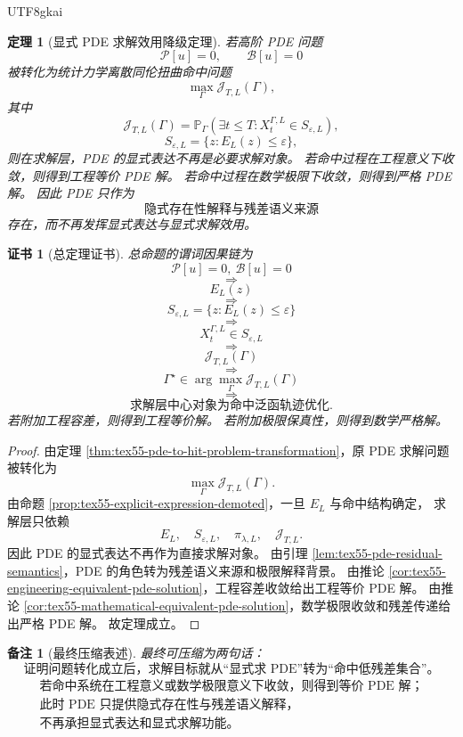 \documentclass[12pt]{article}
\newtheorem{theorem}{定理}[section]
\newtheorem{remark}{备注}[section]
\newtheorem{Certificate}{证书}[section]
\begin{document}
\begin{CJK*}{UTF8}{gkai}
\begin{theorem}[显式 PDE 求解效用降级定理]
\label{thm:tex55-explicit-pde-solution-demotion}
若高阶 PDE 问题
\[
  \mathcal P[u]=0,
  \qquad
  \mathcal B[u]=0
\]
被转化为统计力学离散同伦扭曲命中问题
\[
  \max_\Gamma\mathcal J_{T,L}(\Gamma),
\]
其中
\[
  \mathcal J_{T,L}(\Gamma)
  =
  \mathbb P_\Gamma
  \left(
  \exists t\le T:
  X_t^{\Gamma,L}\in S_{\varepsilon,L}
  \right),
\]
\[
  S_{\varepsilon,L}
  =
  \{z:E_L(z)\le\varepsilon\},
\]
则在求解层，PDE 的显式表达不再是必要求解对象。
若命中过程在工程意义下收敛，则得到工程等价 PDE 解。
若命中过程在数学极限下收敛，则得到严格 PDE 解。
因此 PDE 只作为
\[
  \boxed{
  \text{隐式存在性解释与残差语义来源}
  }
\]
存在，而不再发挥显式表达与显式求解效用。
\end{theorem}

\begin{Certificate}[总定理证书]
\label{cert:tex55-explicit-pde-solution-demotion}
总命题的谓词因果链为
\[
  \mathcal P[u]=0,\ \mathcal B[u]=0
\]
\[
  \Longrightarrow
\]
\[
  E_L(z)
\]
\[
  \Longrightarrow
\]
\[
  S_{\varepsilon,L}=\{z:E_L(z)\le\varepsilon\}
\]
\[
  \Longrightarrow
\]
\[
  X_t^{\Gamma,L}\in S_{\varepsilon,L}
\]
\[
  \Longrightarrow
\]
\[
  \mathcal J_{T,L}(\Gamma)
\]
\[
  \Longrightarrow
\]
\[
  \Gamma^\star\in\arg\max_\Gamma\mathcal J_{T,L}(\Gamma)
\]
\[
  \Longrightarrow
\]
\[
  \text{求解层中心对象为命中泛函轨迹优化}.
\]
若附加工程容差，则得到工程等价解。
若附加极限保真性，则得到数学严格解。
\end{Certificate}

\begin{proof}
由定理 \ref{thm:tex55-pde-to-hit-problem-transformation}，原 PDE 求解问题被转化为
\[
  \max_\Gamma\mathcal J_{T,L}(\Gamma).
\]
由命题 \ref{prop:tex55-explicit-expression-demoted}，一旦 \(E_L\) 与命中结构确定，
求解层只依赖
\[
  E_L,\quad S_{\varepsilon,L},\quad \pi_{\lambda,L},\quad \mathcal J_{T,L}.
\]
因此 PDE 的显式表达不再作为直接求解对象。
由引理 \ref{lem:tex55-pde-residual-semantics}，PDE 的角色转为残差语义来源和极限解释背景。
由推论 \ref{cor:tex55-engineering-equivalent-pde-solution}，工程容差收敛给出工程等价 PDE 解。
由推论 \ref{cor:tex55-mathematical-equivalent-pde-solution}，数学极限收敛和残差传递给出严格 PDE 解。
故定理成立。
\end{proof}

\begin{remark}[最终压缩表述]
最终可压缩为两句话：
\[
  \boxed{
  \text{证明问题转化成立后，求解目标就从“显式求 PDE”转为“命中低残差集合”。}
  }
\]
\[
  \boxed{
  \begin{gathered}
  \text{若命中系统在工程意义或数学极限意义下收敛，则得到等价 PDE 解；}\\
  \text{此时 PDE 只提供隐式存在性与残差语义解释，}\\
  \text{不再承担显式表达和显式求解功能。}
  \end{gathered}
  }
\]
\end{remark}


\end{CJK*}
\end{document}

